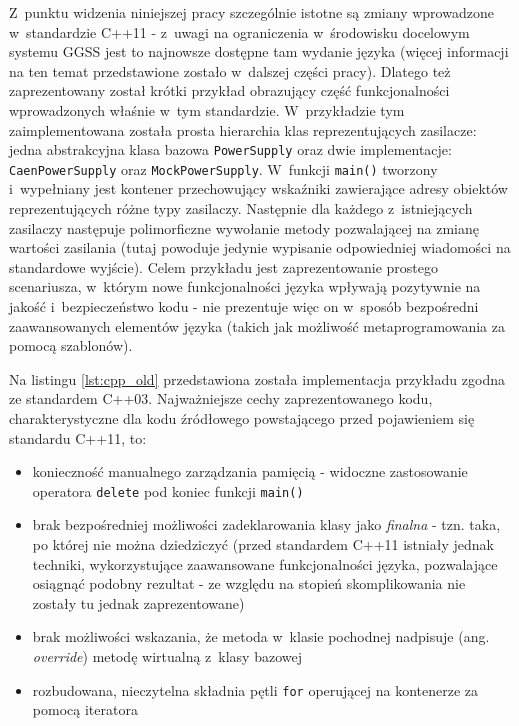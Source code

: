 Z~punktu widzenia niniejszej pracy szczególnie istotne są zmiany wprowadzone w~standardzie C++11 - z~uwagi na ograniczenia w~środowisku docelowym systemu GGSS jest to najnowsze dostępne tam wydanie języka (więcej informacji na ten temat przedstawione zostało w~dalszej części pracy). Dlatego też zaprezentowany został krótki przykład obrazujący część funkcjonalności wprowadzonych właśnie w~tym standardzie. W~przykładzie tym zaimplementowana została prosta hierarchia klas reprezentujących zasilacze: jedna abstrakcyjna klasa bazowa \lstinline{PowerSupply} oraz dwie implementacje: \lstinline{CaenPowerSupply} oraz \lstinline{MockPowerSupply}. W~funkcji \lstinline{main()} tworzony i~wypełniany jest kontener przechowujący wskaźniki zawierające adresy obiektów reprezentujących różne typy zasilaczy. Następnie dla każdego z~istniejących zasilaczy następuje polimorficzne wywołanie metody pozwalającej na zmianę wartości zasilania (tutaj powoduje jedynie wypisanie odpowiedniej wiadomości na standardowe wyjście). Celem przykładu jest zaprezentowanie prostego scenariusza, w~którym nowe funkcjonalności języka wpływają pozytywnie na jakość i~bezpieczeństwo kodu - nie prezentuje więc on w~sposób bezpośredni zaawansowanych elementów języka (takich jak możliwość metaprogramowania za pomocą szablonów).

Na listingu \ref{lst:cpp_old} przedstawiona została implementacja przykładu zgodna ze standardem C++03. Najważniejsze cechy zaprezentowanego kodu, charakterystyczne dla kodu źródłowego powstającego przed pojawieniem się standardu C++11, to: 
\begin{itemize}
\item konieczność manualnego zarządzania pamięcią - widoczne zastosowanie operatora \lstinline{delete} pod koniec funkcji \lstinline{main()}
\item brak bezpośredniej możliwości zadeklarowania klasy jako \emph{finalna} - tzn. taka, po której nie można dziedziczyć (przed standardem C++11 istniały jednak techniki, wykorzystujące zaawansowane funkcjonalności języka, pozwalające osiągnąć podobny rezultat - ze względu na stopień skomplikowania nie zostały tu jednak zaprezentowane)
\item brak możliwości wskazania, że metoda w~klasie pochodnej nadpisuje (ang. \emph{override}) metodę wirtualną z~klasy bazowej
\item rozbudowana, nieczytelna składnia pętli \lstinline{for} operującej na kontenerze za pomocą iteratora 
\end{itemize}

